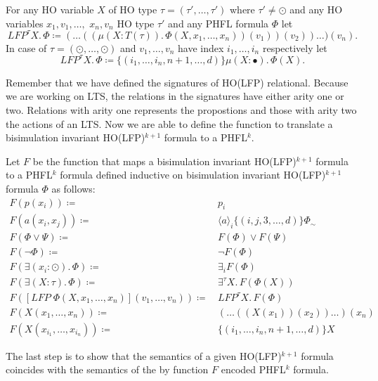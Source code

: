 \begin{definition}
    For any HO variable $X$ of HO type $\tau = (\tau', \dots, \tau')$ where $\tau' \neq \odot$ and any HO variables
    $x_1, v_1, \dots, $ $x_n, v_n$ HO type $\tau'$ and any PHFL formula $\Phi$ let
    \[LFP^\tau X.\,\Phi \coloneqq (\dots ((\mu (X \colon T(\tau)).\,\Phi(X, x_1, \dots, x_n))(v_1))(v_2))\dots)(v_n).\]
    In case of $\tau = (\odot, \dots, \odot)$ and $v_1, \dots, v_n$ have index $i_1, \dots, i_n$ respectively let
    \[LFP^{\tau} X.\,\Phi \coloneqq \{(i_1, \dots, i_n, n + 1, \dots, d)\} \mu (X \colon \bullet).\,\Phi(X).\]
\end{definition}

Remember that we have defined the signatures of HO(LFP) relational. Because we are working on LTS, the relations in
the signatures have either arity one or two. Relations with arity one represents the propostions and those with arity
two the actions of an LTS. Now we are able to define the function to translate a bisimulation invariant HO(LFP)$^{k+1}$
formula to a PHFL$^k$.

\begin{definition}
    Let $F$ be the function that maps a bisimulation invariant HO(LFP)$^{k+1}$ formula to a PHFL$^k$ formula defined
    inductive on bisimulation invariant HO(LFP)$^{k+1}$ formula $\Phi$ as follows:
    \begin{align*}
        F(p(x_i)) \coloneqq &\, p_i \\
        F(a(x_i, x_j)) \coloneqq &\, \langle a \rangle_i \{(i, j, 3, \dots, d)\} \Phi_\sim \\
        F(\Phi \vee \Psi) \coloneqq &\, F(\Phi) \vee F(\Psi) \\
        F(\neg \Phi) \coloneqq &\, \neg F(\Phi) \\
        F(\exists (x_i \colon \odot).\,\Phi) \coloneqq &\, \exists_i F(\Phi) \\
        F(\exists (X \colon \tau).\,\Phi) \coloneqq &\, \exists^\tau X.\,F(\Phi(X)) \\
        F([LFP\;\Phi(X, x_1, \dots, x_n)](v_1, \dots, v_n)) \coloneqq &\,LFP^\tau X.\, F(\Phi) \\
        F(X(x_1, \dots, x_n)) \coloneqq &\, (\dots ((X(x_1))(x_2))\dots)(x_n)\\
        F(X(x_{i_1}, \dots, x_{i_n})) \coloneqq &\, \{(i_1, \dots, i_n, n + 1, \dots, d)\}X
    \end{align*}
\end{definition}

The last step is to show that the semantics of a given HO(LFP)$^{k+1}$ formula coincides with the semantics of the by
function $F$ encoded PHFL$^k$ formula.

